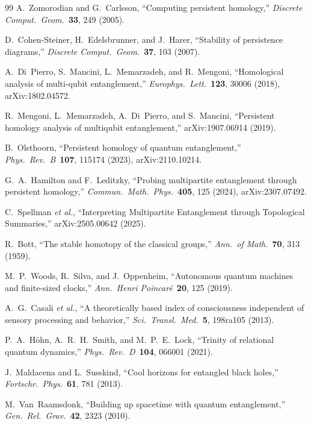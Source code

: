 \documentclass[12pt, a4paper]{article}
\begin{document}
\begin{thebibliography}{99}
A.~Zomorodian and G.~Carlsson, ``Computing persistent homology,'' \textit{Discrete Comput.\ Geom.}\ \textbf{33}, 249 (2005).

D.~Cohen-Steiner, H.~Edelsbrunner, and J.~Harer, ``Stability of persistence diagrams,'' \textit{Discrete Comput.\ Geom.}\ \textbf{37}, 103 (2007).

A.~Di~Pierro, S.~Mancini, L.~Memarzadeh, and R.~Mengoni, ``Homological analysis of multi-qubit entanglement,'' \textit{Europhys.\ Lett.}\ \textbf{123}, 30006 (2018), arXiv:1802.04572.

R.~Mengoni, L.~Memarzadeh, A.~Di~Pierro, and S.~Mancini, ``Persistent homology analysis of multiqubit entanglement,'' arXiv:1907.06914 (2019).

B.~Olsthoorn, ``Persistent homology of quantum entanglement,'' \textit{Phys.\ Rev.\ B}\ \textbf{107}, 115174 (2023), arXiv:2110.10214.

G.~A.~Hamilton and F.~Leditzky, ``Probing multipartite entanglement through persistent homology,'' \textit{Commun.\ Math.\ Phys.}\ \textbf{405}, 125 (2024), arXiv:2307.07492.

C.~Spellman \textit{et al.}, ``Interpreting Multipartite Entanglement through Topological Summaries,'' arXiv:2505.00642 (2025).

R.~Bott, ``The stable homotopy of the classical groups,'' \textit{Ann.\ of Math.}\ \textbf{70}, 313 (1959).

M.~P.~Woods, R.~Silva, and J.~Oppenheim, ``Autonomous quantum machines and finite-sized clocks,'' \textit{Ann.\ Henri Poincar\'{e}}\ \textbf{20}, 125 (2019).

A.~G.~Casali \textit{et al.}, ``A theoretically based index of consciousness independent of sensory processing and behavior,'' \textit{Sci.\ Transl.\ Med.}\ \textbf{5}, 198ra105 (2013).

P.~A.~H\"{o}hn, A.~R.~H.~Smith, and M.~P.~E.~Lock, ``Trinity of relational quantum dynamics,'' \textit{Phys.\ Rev.\ D}\ \textbf{104}, 066001 (2021).

J.~Maldacena and L.~Susskind, ``Cool horizons for entangled black holes,'' \textit{Fortschr.\ Phys.}\ \textbf{61}, 781 (2013).

M.~Van~Raamsdonk, ``Building up spacetime with quantum entanglement,'' \textit{Gen.\ Rel.\ Grav.}\ \textbf{42}, 2323 (2010).


\end{thebibliography}
\end{document}
